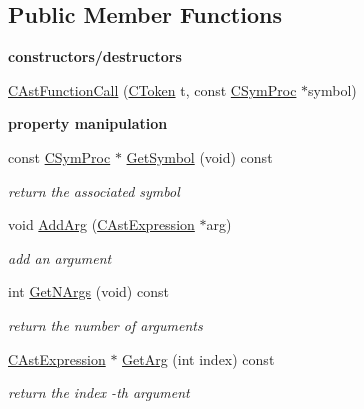 \subsection*{Public Member Functions}
\begin{Indent}{\bf constructors/destructors}\par
\begin{DoxyCompactItemize}
\item 
\hyperlink{classCAstFunctionCall_aca0b99fa80fa20ff029acb32baec3a61}{C\-Ast\-Function\-Call} (\hyperlink{classCToken}{C\-Token} t, const \hyperlink{classCSymProc}{C\-Sym\-Proc} $\ast$symbol)
\end{DoxyCompactItemize}
\end{Indent}
\begin{Indent}{\bf property manipulation}\par
\begin{DoxyCompactItemize}
\item 
\hypertarget{classCAstFunctionCall_a9c3d72dc4af3c05f5e46493ab212f5b9}{const \hyperlink{classCSymProc}{C\-Sym\-Proc} $\ast$ \hyperlink{classCAstFunctionCall_a9c3d72dc4af3c05f5e46493ab212f5b9}{Get\-Symbol} (void) const }\label{classCAstFunctionCall_a9c3d72dc4af3c05f5e46493ab212f5b9}

\begin{DoxyCompactList}\small\item\em return the associated symbol \end{DoxyCompactList}\item 
void \hyperlink{classCAstFunctionCall_ae4743f64c7ea87c71c8856cd42943b7b}{Add\-Arg} (\hyperlink{classCAstExpression}{C\-Ast\-Expression} $\ast$arg)
\begin{DoxyCompactList}\small\item\em add an argument \end{DoxyCompactList}\item 
\hypertarget{classCAstFunctionCall_a84a7ed592c3a81e5ca0d938d1b6c0a5f}{int \hyperlink{classCAstFunctionCall_a84a7ed592c3a81e5ca0d938d1b6c0a5f}{Get\-N\-Args} (void) const }\label{classCAstFunctionCall_a84a7ed592c3a81e5ca0d938d1b6c0a5f}

\begin{DoxyCompactList}\small\item\em return the number of arguments \end{DoxyCompactList}\item 
\hypertarget{classCAstFunctionCall_a21f45ea2302e656063d59c5180e8c337}{\hyperlink{classCAstExpression}{C\-Ast\-Expression} $\ast$ \hyperlink{classCAstFunctionCall_a21f45ea2302e656063d59c5180e8c337}{Get\-Arg} (int index) const }\label{classCAstFunctionCall_a21f45ea2302e656063d59c5180e8c337}

\begin{DoxyCompactList}\small\item\em return the {\itshape index} -\/th argument \end{DoxyCompactList}\end{DoxyCompactItemize}
\end{Indent}
